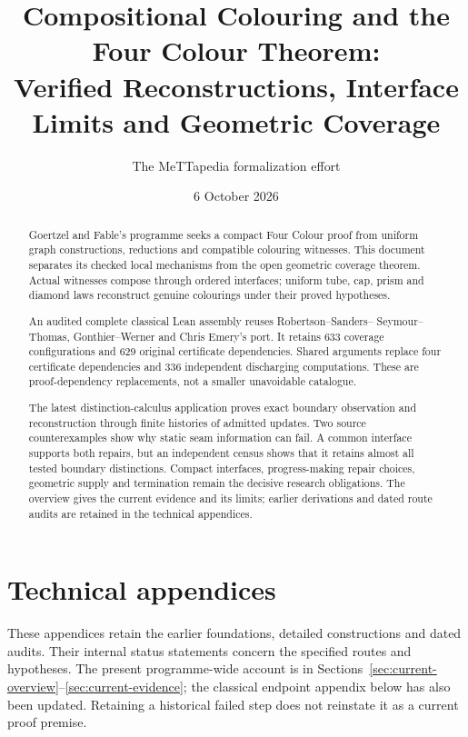 \documentclass[11pt]{article}
\title{Compositional Colouring and the Four Colour Theorem:\\
\large Verified Reconstructions, Interface Limits and Geometric Coverage}
\author{The MeTTapedia formalization effort}
\date{6 October 2026}
\theoremstyle{definition}
\begin{document}
\maketitle
\sloppy

\begin{abstract}
Goertzel and Fable's programme seeks a compact Four Colour proof from
uniform graph constructions, reductions and compatible colouring
witnesses. This document separates its checked local mechanisms from the
open geometric coverage theorem. Actual witnesses compose through ordered
interfaces; uniform tube, cap, prism and diamond laws reconstruct genuine
colourings under their proved hypotheses.

An audited complete classical Lean assembly reuses Robertson--Sanders--
Seymour--Thomas, Gonthier--Werner and Chris Emery's port. It retains 633
coverage configurations and 629 original certificate dependencies.
Shared arguments replace four certificate dependencies and 336 independent
discharging computations. These are proof-dependency replacements, not a
smaller unavoidable catalogue.

The latest distinction-calculus application proves exact boundary
observation and reconstruction through finite histories of admitted
updates. Two source counterexamples show why static seam information can
fail. A common interface supports both repairs, but an independent census
shows that it retains almost all tested boundary distinctions. Compact
interfaces, progress-making repair choices, geometric supply and
termination remain the decisive research obligations. The overview gives
the current evidence and its limits; earlier derivations and dated route
audits are retained in the technical appendices.
\end{abstract}

\setcounter{tocdepth}{1}
\clearpage
\tableofcontents
\clearpage



\clearpage
\section*{Technical appendices}
These appendices retain the earlier foundations, detailed constructions and
dated audits. Their internal status statements concern the specified
routes and hypotheses. The present programme-wide account is in
Sections~\ref{sec:current-overview}--\ref{sec:current-evidence};
the classical endpoint appendix below has also been updated. Retaining a
historical failed step does not reinstate it as a current proof premise.
\end{document}
